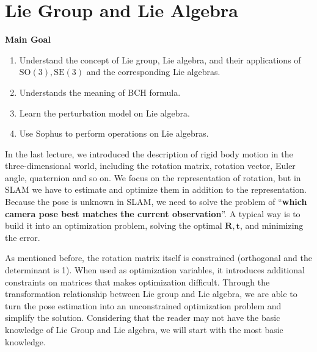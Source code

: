 \chapter{Lie Group and Lie Algebra}
\label{cpt:4}
\begin{mdframed}
    \textbf{Main Goal}
    \begin{enumerate}
        \item Understand the concept of Lie group, Lie algebra, and their applications of $ \mathrm{SO}( 3 ), \mathrm{SE}( 3 ) $ and the corresponding Lie algebras.
        \item Understands the meaning of BCH formula.
        \item Learn the perturbation model on Lie algebra.
        \item Use Sophus to perform operations on Lie algebras.
    \end{enumerate}
\end{mdframed}

In the last lecture, we introduced the description of rigid body motion in the three-dimensional world, including the rotation matrix, rotation vector, Euler angle, quaternion and so on. We focus on the representation of rotation, but in SLAM we have to estimate and optimize them in addition to the representation. Because the pose is unknown in SLAM, we need to solve the problem of ``\textbf {which camera pose best matches the current observation}''. A typical way is to build it into an optimization problem, solving the optimal $ \mathbf{R}, \mathbf{t}$, and minimizing the error.

As mentioned before, the rotation matrix itself is constrained (orthogonal and the determinant is 1). When used as optimization variables, it introduces additional constraints on matrices that makes optimization difficult. Through the transformation relationship between Lie group and Lie algebra, we are able to turn the pose estimation into an unconstrained optimization problem and simplify the solution. Considering that the reader may not have the basic knowledge of Lie Group and Lie algebra, we will start with the most basic knowledge.

\newpage
